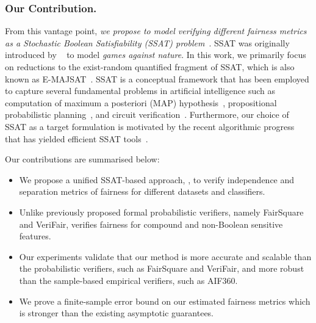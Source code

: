 \subsubsection{Our Contribution.} From this vantage point, \textit{we propose to model verifying different fairness metrics as a Stochastic Boolean Satisfiability (SSAT) problem}~\cite{littman2001stochastic}. SSAT was originally introduced by ~\cite{papadimitriou1985games} to model {\em games against nature}. In this work, we primarily focus on reductions to the exist-random quantified fragment of SSAT, which is also known as E-MAJSAT~\cite{littman2001stochastic}.   SSAT is a conceptual framework that has been employed to capture several fundamental problems in artificial intelligence such as computation of maximum a posteriori (MAP) hypothesis~\cite{fremont2017maximum},  propositional probabilistic planning~\cite{majercik2007appssat},  and circuit verification~\cite{lee2018towards}. Furthermore, our choice of SSAT as a target formulation is motivated by the recent algorithmic progress that has yielded efficient SSAT tools~\cite{lee2017solving,lee2018solving}.




Our contributions are summarised below:
\begin{itemize}
	\item We propose a unified SSAT-based approach, {\justicia}, to verify independence and separation metrics of fairness for different datasets and classifiers.
	\item Unlike previously proposed formal probabilistic verifiers, namely FairSquare and VeriFair, {\justicia} verifies fairness for compound and non-Boolean sensitive features.%
	\item Our experiments validate that our method is more accurate and scalable than the probabilistic verifiers, such as FairSquare and VeriFair, and more robust than the sample-based empirical verifiers, such as AIF360.
	\item We prove a finite-sample error bound on our estimated fairness metrics which is stronger than the existing asymptotic guarantees.
\end{itemize}

